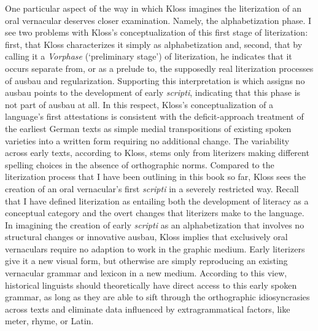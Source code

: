 One particular aspect of the way in which Kloss imagines the literization of an oral vernacular deserves closer examination. Namely, the alphabetization phase. I see two problems with Kloss’s conceptualization of this first stage of literization: first, that Kloss characterizes it simply as alphabetization and, second, that by calling it a \textit{Vorphase} (‘preliminary stage') of literization, he indicates that it occurs separate from, or as a prelude to, the supposedly real literization processes of ausbau and regularization. Supporting this interpretation is  which assigns no ausbau points to the development of early \textit{scripti}, indicating that this phase is not part of ausbau at all. In this respect, Kloss’s conceptualization of a language’s first attestations is consistent with the deficit-approach treatment of the earliest German texts as simple medial transpositions of existing spoken varieties into a written form requiring no additional change. The variability across early texts, according to Kloss, stems only from literizers making different spelling choices in the absence of orthographic norms. Compared to the literization process that I have been outlining in this book so far, Kloss sees the creation of an oral vernacular’s first \textit{scripti} in a severely restricted way. Recall that I have defined literization as entailing both the development of literacy as a conceptual category and the overt changes that literizers make to the language. In imagining the creation of early \textit{scripti} as an alphabetization that involves no structural changes or innovative ausbau, Kloss implies that exclusively oral vernaculars require no adaption to work in the graphic medium. Early literizers give it a new visual form, but otherwise are simply reproducing an existing vernacular grammar and lexicon in a new medium. According to this view, historical linguists should theoretically have direct access to this early spoken grammar, as long as they are able to sift through the orthographic idiosyncrasies across texts and eliminate data influenced by extragrammatical factors, like meter, rhyme, or Latin.

